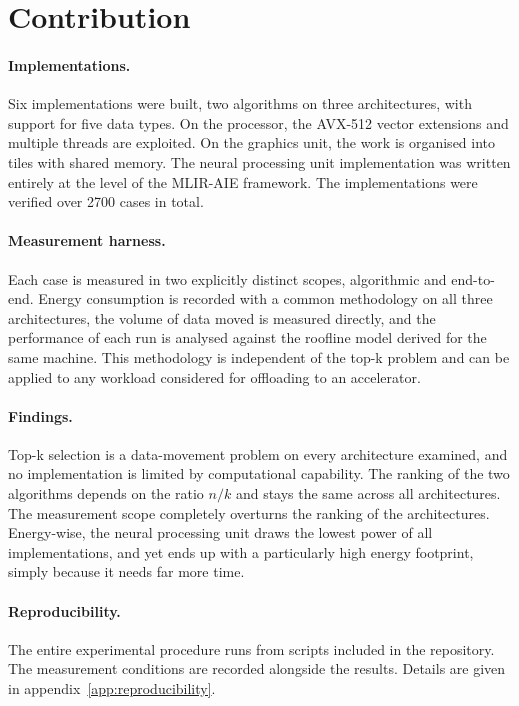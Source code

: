 \section{Contribution}
\label{sec:intro-contribution}

\paragraph{Implementations.} Six implementations were built, two algorithms on
three architectures, with support for five data types. On the processor, the
AVX-512 vector extensions and multiple threads are exploited. On the graphics
unit, the work is organised into tiles with shared memory. The neural
processing unit implementation was written entirely at the level of the
MLIR-AIE framework. The implementations were verified over 2700 cases in total.

\paragraph{Measurement harness.} Each case is measured in two explicitly
distinct scopes, algorithmic and end-to-end. Energy consumption is recorded
with a common methodology on all three architectures, the volume of data moved
is measured directly, and the performance of each run is analysed against the
roofline model derived for the same machine. This methodology is independent of
the top-k problem and can be applied to any workload considered for offloading
to an accelerator.

\paragraph{Findings.} Top-k selection is a data-movement problem on every
architecture examined, and no implementation is limited by computational
capability. The ranking of the two algorithms depends on the ratio $n/k$ and
stays the same across all architectures. The measurement scope completely
overturns the ranking of the architectures. Energy-wise, the neural processing
unit draws the lowest power of all implementations, and yet ends up with a
particularly high energy footprint, simply because it needs far more time.

\paragraph{Reproducibility.} The entire experimental procedure runs from
scripts included in the repository. The measurement conditions are recorded
alongside the results. Details are given in appendix~\ref{app:reproducibility}.

